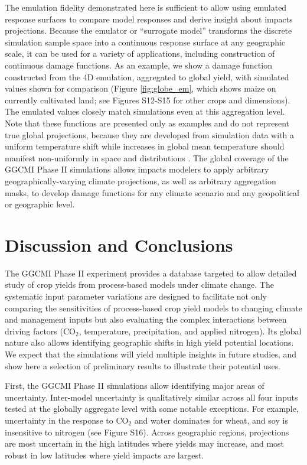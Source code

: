 \documentclass[esd, manuscript]{copernicus} %
\begin{document}
The emulation fidelity demonstrated here is sufficient to allow using emulated response surfaces to compare model responses and derive insight about impacts projections. Because the emulator or ``surrogate model'' transforms the discrete simulation sample space into a continuous response surface at any geographic scale, it can be used for a variety of applications, including construction of continuous damage functions. As an example, we show a damage function constructed from the 4D emulation, aggregated to global yield, with simulated values shown for comparison (Figure \ref{fig:globe_em}, which shows maize on currently cultivated land; see Figures S12-S15 for other crops and dimensions). The emulated values closely match simulations even at this aggregation level. Note that these functions are presented only as examples and do not represent true global projections, because they are developed from simulation data with a uniform temperature shift while increases in global mean temperature should manifest non-uniformly in space and distributions \citep{Sippel2015}. The global coverage of the GGCMI Phase II simulations allows impacts modelers to apply arbitrary geographically-varying climate projections, as well as arbitrary aggregation masks, to develop damage functions for any climate scenario and any geopolitical or geographic level.

\section{Discussion and Conclusions} 
\label{S:6}
The GGCMI Phase II experiment provides a database targeted to allow detailed study of crop yields from process-based models under climate change. The systematic input parameter variations are designed to facilitate not only comparing the sensitivities of process-based crop yield models to changing climate and management inputs but also evaluating the complex interactions between driving factors (CO$_2$, temperature, precipitation, and applied nitrogen). Its global nature also allows identifying geographic shifts in high yield potential locations. We expect that the simulations will yield multiple insights in future studies, and show here a selection of preliminary results to illustrate their potential uses. 

First, the GGCMI Phase II simulations allow identifying major areas of uncertainty. Inter-model uncertainty is qualitatively similar across all four inputs tested at the globally aggregate level with some notable exceptions. For example, uncertainty in the response to CO$_2$ and water dominates for wheat, and soy is insensitive to nitrogen (see Figure S16). Across geographic regions, projections are most uncertain in the high latitudes where yields may increase, and most robust in low latitudes where yield impacts are largest.
\end{document}
